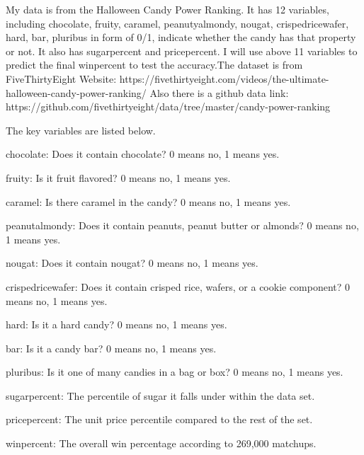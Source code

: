 My data is from the Halloween Candy Power Ranking. It has 12 variables, including chocolate, fruity, caramel, peanutyalmondy, nougat, crispedricewafer, hard, bar, pluribus in form of 0/1, indicate whether the candy has that property or not. It also has sugarpercent and pricepercent. I will use above 11 variables to predict the final winpercent to test the accuracy.The dataset is from FiveThirtyEight Website: https://fivethirtyeight.com/videos/the-ultimate-halloween-candy-power-ranking/ Also there is a github data link: https://github.com/fivethirtyeight/data/tree/master/candy-power-ranking

The key variables are listed below.

chocolate: Does it contain chocolate? 0 means no, 1 means yes.

fruity: Is it fruit flavored? 0 means no, 1 means yes.

caramel: Is there caramel in the candy? 0 means no, 1 means yes.

peanutalmondy: Does it contain peanuts, peanut butter or almonds? 0 means no, 1 means yes.

nougat: Does it contain nougat? 0 means no, 1 means yes.

crispedricewafer: Does it contain crisped rice, wafers, or a cookie component? 0 means no, 1 means yes.

hard: Is it a hard candy? 0 means no, 1 means yes.

bar: Is it a candy bar? 0 means no, 1 means yes.

pluribus: Is it one of many candies in a bag or box? 0 means no, 1 means yes.

sugarpercent: The percentile of sugar it falls under within the data set.

pricepercent: The unit price percentile compared to the rest of the set.

winpercent: The overall win percentage according to 269,000 matchups.